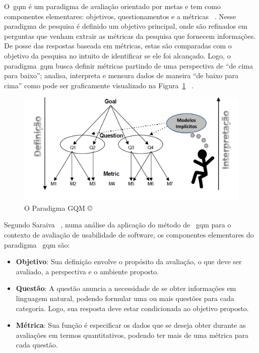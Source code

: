O~\ac{gqm} é um paradigma de avaliação orientado por metas e tem como componentes elementares: objetivos, questionamentos e a métricas ~\cite{saraiva2006}. Nesse paradigma de pesquisa é definido um objetivo principal, onde são refinados em perguntas que venham extrair as métricas da pesquisa que fornecem informações. De posse das respostas baseada em métricas, estas são comparadas com o objetivo da pesquisa no intuito de identificar se ele foi alcançado. Logo, o paradigma~\ac{gqm} busca definir métricas partindo de uma perspectiva de ``de cima para baixo''; analisa, interpreta e mensura dados de maneira ``de baixo para cima'' como pode ser graficamente visualizado na Figura~\ref{fig:gqm} ~\cite{van1999goal}. 

\begin{figure}[!htbp]
 \centering
 \includegraphics[scale=0.50]{./img/gqm.png}
 \caption[O Paradigma GQM \copyright]{O Paradigma GQM \copyright~\cite{van1999goal}}
 \label{fig:gqm}
\end{figure}

Segundo Saraiva ~\cite{saraiva2006}, numa análise da aplicação do método de ~\ac{gqm} para o contexto de avaliação de usabilidade de software, os componentes elementares do paradigma ~\ac{gqm} são:

\begin{itemize}
	\item \textbf{Objetivo}: Sua definição envolve o propósito da avaliação, o que deve ser avaliado, a perspectiva e o ambiente proposto.
	\item \textbf{Questão}: A questão anuncia a necessidade de se obter informações em linguagem natural, podendo formular uma ou mais questões para cada categoria. Logo, sua resposta deve estar condicionada ao objetivo proposto.
	\item \textbf{Métrica}: Sua função é especificar os dados que se deseja obter durante as avaliações em termos quantitativos, podendo ter mais de uma métrica para cada questão.	
\end{itemize}

